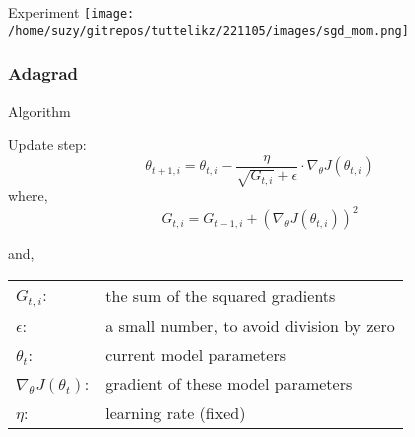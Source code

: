     \begin{frame}{Experiment}
      \centering
        \texttt{[image: /home/suzy/gitrepos/tuttelikz/221105/images/sgd\_mom.png]}

      \end{frame}

      
    \begin{frame}
      \frametitle{Adagrad}
      \begin{block}{Algorithm}

        Update step:
        \begin{equation}    %
          \theta_{t+1,i} = \theta_{t,i} - \frac{\eta}{\sqrt{G_{t,i}}+ \epsilon} \cdot \nabla_{\theta}J(\theta_{t,i})
        \end{equation}
        where, \\
        \begin{equation}    %
          G_{t,i} = G_{t-1,i} + (\nabla_{\theta}J(\theta_{t,i}))^2
        \end{equation}
        

        \vskip 0.3cm
        and, \\
        \begin{tabular}{l l}
          $G_{t,i}$: & the sum of the squared gradients \\
          $\epsilon$: & a small number, to avoid division by zero\\
          $\theta_{t}$: & current model parameters \\
          $\nabla_{\theta}J(\theta_t)$: & gradient of these model parameters \\
          $\eta$: & learning rate (fixed)
        \end{tabular}
      \end{block}
    \end{frame}


